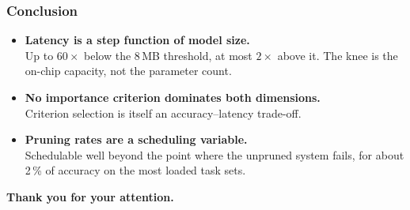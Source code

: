 \begin{frame}
\frametitle{Conclusion}

\begin{itemize}\setlength{\itemsep}{8pt}
  \item[{\color{blue!80!black}$\bullet$}]
    \textbf{Latency is a step function of model size.}\\
    {\small Up to $60\times$ below the 8\,MB threshold, at most $2\times$ above it.
     The knee is the on-chip capacity, not the parameter count.}
  \item[{\color{blue!80!black}$\bullet$}]
    \textbf{No importance criterion dominates both dimensions.}\\
    {\small Criterion selection is itself an accuracy--latency trade-off.}
  \item[{\color{blue!80!black}$\bullet$}]
    \textbf{Pruning rates are a scheduling variable.}\\
    {\small Schedulable well beyond the point where the unpruned system fails,
     for about 2\,\% of accuracy on the most loaded task sets.}
\end{itemize}

\vspace{0.9cm}
\begin{center}
{\color{blue!80!black}\textbf{Thank you for your attention.}}
\end{center}

\end{frame}
